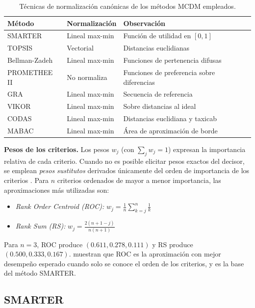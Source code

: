 \begin{table}[H]
\centering
\caption{Técnicas de normalización canónicas de los métodos MCDM empleados.}
\label{tab:normalizaciones}
\begin{tabular}{lll}
\hline
\textbf{Método} & \textbf{Normalización} & \textbf{Observación} \\
\hline
SMARTER & Lineal max-min & Función de utilidad en $[0,1]$ \\
TOPSIS & Vectorial & Distancias euclidianas \\
Bellman-Zadeh & Lineal max-min & Funciones de pertenencia difusas \\
PROMETHEE II & No normaliza & Funciones de preferencia sobre diferencias \\
GRA & Lineal max-min & Secuencia de referencia \\
VIKOR & Lineal max-min & Sobre distancias al ideal \\
CODAS & Lineal max-min & Distancias euclidiana y taxicab \\
MABAC & Lineal max-min & Área de aproximación de borde \\
\hline
\end{tabular}
\end{table}

\textbf{Pesos de los criterios.} Los pesos $w_j$ (con $\sum_j w_j = 1$) expresan la importancia relativa de cada criterio. Cuando no es posible elicitar pesos exactos del decisor, se emplean \textit{pesos sustitutos} derivados únicamente del orden de importancia de los criterios \citep{Roberts2002}. Para $n$ criterios ordenados de mayor a menor importancia, las aproximaciones más utilizadas son:

\begin{itemize}
    \item \textit{Rank Order Centroid (ROC):} $w_j = \frac{1}{n} \sum_{k=j}^{n} \frac{1}{k}$
    \item \textit{Rank Sum (RS):} $w_j = \frac{2(n + 1 - j)}{n(n+1)}$
\end{itemize}

Para $n = 3$, ROC produce $(0.611, 0.278, 0.111)$ y RS produce $(0.500, 0.333, 0.167)$. \citet{Roberts2002} muestran que ROC es la aproximación con mejor desempeño esperado cuando solo se conoce el orden de los criterios, y es la base del método SMARTER.

\subsection{SMARTER}

